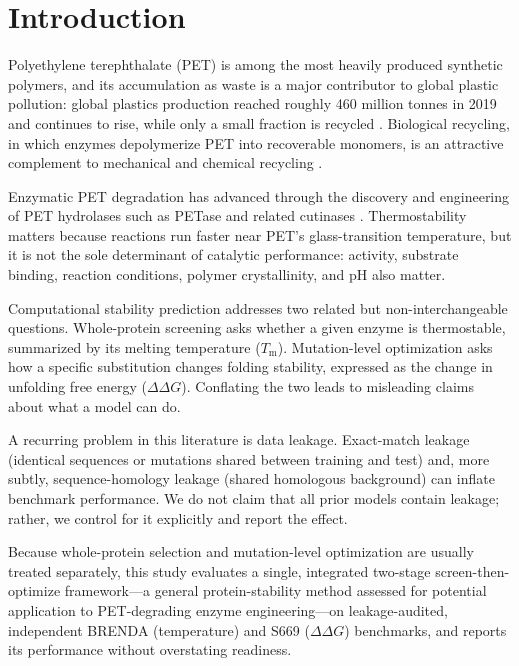 \documentclass[sn-nature]{sn-jnl}%
\newcommand{\ddg}{\ensuremath{\Delta\Delta G}}
\newcommand{\Tm}{\ensuremath{T_\mathrm{m}}}
\begin{document}
\maketitle

\section{Introduction}\label{sec:intro}
Polyethylene terephthalate (PET) is among the most heavily produced synthetic polymers,
and its accumulation as waste is a major contributor to global plastic pollution: global
plastics production reached roughly 460 million tonnes in 2019 and continues to rise, while
only a small fraction is recycled \cite{oecd2022plastics}.
Biological recycling, in which
enzymes depolymerize PET into recoverable monomers, is an attractive complement to
mechanical and chemical recycling \cite{yoshida2016}.

Enzymatic PET degradation has advanced through the discovery and engineering of PET
hydrolases such as PETase and related cutinases \cite{yoshida2016,tournier2020,lu2022}.
Thermostability matters because reactions run faster near PET's glass-transition
temperature, but it is not the sole determinant of catalytic performance: activity,
substrate binding, reaction conditions, polymer crystallinity, and pH also matter.

Computational stability prediction addresses two related but non-interchangeable
questions. Whole-protein screening asks whether a given enzyme is thermostable,
summarized by its melting temperature (\Tm). Mutation-level optimization asks how a
specific substitution changes folding stability, expressed as the change in unfolding
free energy (\ddg). Conflating the two leads to misleading claims about what a model can
do.

A recurring problem in this literature is data leakage. Exact-match leakage (identical
sequences or mutations shared between training and test) and, more subtly,
sequence-homology leakage (shared homologous background) can inflate benchmark
performance. We do not claim that all prior models contain leakage; rather, we control
for it explicitly and report the effect.

Because whole-protein selection and mutation-level optimization are usually treated
separately, this study evaluates a single, integrated two-stage screen-then-optimize
framework---a general protein-stability method assessed for potential application to
PET-degrading enzyme engineering---on leakage-audited, independent BRENDA (temperature)
and S669 (\ddg) benchmarks, and reports its performance without overstating readiness.
\end{document}
